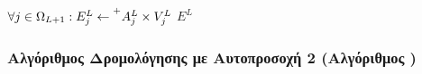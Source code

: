 {\begin{algorithm}[hp]
\begin{algorithmic}[1]
      
    \State $\forall j \in \Omega_{L+1}: E^L_j \gets \prescript{+}{}{A_j^L} \times V_j^L$  \label{op:method3_sum_weighted_sum} %
    \State \Return $E^L$ 
    \EndProcedure

  \end{algorithmic}
  \end{algorithm}
}

\subsubsection{Αλγόριθμος Δρομολόγησης με Αυτο\textendash προσοχή 2 (Αλγόριθμος )}

